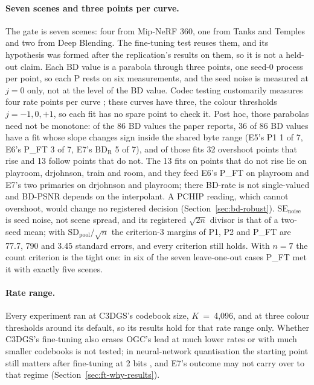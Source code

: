 \paragraph{Seven scenes and three points per curve.}
The gate is seven scenes: four from Mip-NeRF 360, one from Tanks and Temples and two from Deep Blending. %
The fine-tuning test reuses them, and its hypothesis was formed after the replication's results on them, so it is not a held-out claim. %
Each BD value is a parabola through three points, one seed-0 process per point, so each P rests on six measurements, and the seed noise is measured at $j = 0$ only, not at the level of the BD value. %
Codec testing customarily measures four rate points per curve \citep[Sec.~I and II-C]{barman2024bjontegaard}; these curves have three, the colour thresholds $j = -1, 0, +1$, so each fit has no spare point to check it. %
Post hoc, those parabolas need not be monotone: of the 86 BD values the paper reports, 36 of 86 BD values have a fit whose slope changes sign inside the shared byte range (E5's P1 1 of 7, E6's P\_FT 3 of 7, E7's $\mathrm{BD}_{\mathrm{R}}$ 5 of 7), and of those fits 32 overshoot points that rise and 13 follow points that do not. %
The 13 fits on points that do not rise lie on playroom, drjohnson, train and room, and they feed E6's P\_FT on playroom and E7's two primaries on drjohnson and playroom; there BD-rate is not single-valued and BD-PSNR depends on the interpolant. %
A PCHIP reading, which cannot overshoot, would change no registered decision (Section~\ref{sec:bd-robust}). %
$\mathrm{SE}_{\mathrm{noise}}$ is seed noise, not scene spread, and its registered $\sqrt{2n}$ divisor is that of a two-seed mean; with $\mathrm{SD}_{\mathrm{pool}}/\sqrt{n}$ the criterion-3 margins of P1, P2 and P\_FT are 77.7, 790 and 3.45 standard errors, and every criterion still holds. %
With $n = 7$ the count criterion is the tight one: in six of the seven leave-one-out cases P\_FT met it with exactly five scenes. %

\paragraph{Rate range.}
Every experiment ran at C3DGS's codebook size, $K$~=~4,096, and at three colour thresholds around its default, so its results hold for that rate range only. %
Whether C3DGS's fine-tuning also erases OGC's lead at much lower rates or with much smaller codebooks is not tested; in neural-network quantisation the starting point still matters after fine-tuning at 2 bits \citep{chen2025efficientqat,li2024loftq,liao2024apiq}, and E7's outcome may not carry over to that regime (Section~\ref{sec:ft-why-results}). %

